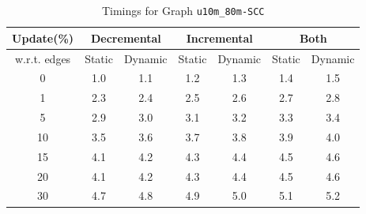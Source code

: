 \begin{table}[H]
    \centering
    \caption{Timings for Graph \texttt{u10m\_80m-SCC} }
    \begin{tabular}{|c|c|c|c|c|c|c|}
        \hline
        \textbf{Update(\%)} & \multicolumn{2}{c|}{\textbf{Decremental}} & \multicolumn{2}{c|}{\textbf{Incremental}} & \multicolumn{2}{c|}{\textbf{Both}} \\
        \hline
        w.r.t. edges & Static &  Dynamic & Static & Dynamic & Static & Dynamic \\
        \hline
        0 & 1.0 & 1.1 & 1.2 & 1.3 & 1.4 & 1.5 \\
        1 & 2.3 & 2.4 & 2.5 & 2.6 & 2.7 & 2.8 \\
        5 & 2.9 & 3.0 & 3.1 & 3.2 & 3.3 & 3.4 \\
        10 & 3.5 & 3.6 & 3.7 & 3.8 & 3.9 & 4.0 \\
        15 & 4.1 & 4.2 & 4.3 & 4.4 & 4.5 & 4.6 \\
        20 & 4.1 & 4.2 & 4.3 & 4.4 & 4.5 & 4.6 \\
        30 & 4.7 & 4.8 & 4.9 & 5.0 & 5.1 & 5.2 \\
        \hline
    \end{tabular}
    \label{tab:timed_results_g8}
\end{table}

